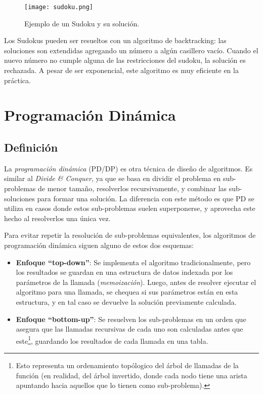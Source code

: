 \begin{figure}[H]
    \centering
    \texttt{[image: sudoku.png]}
    \caption*{Ejemplo de un Sudoku y su solución.}
\end{figure}

Los Sudokus pueden ser resueltos con un algoritmo de backtracking: las soluciones son extendidas agregando un número a algún casillero vacío. Cuando el nuevo número no cumple alguna de las restricciones del sudoku, la solución es rechazada. A pesar de ser exponencial, este algoritmo es muy eficiente en la práctica.

\section{Programación Dinámica}

\subsection{Definición}

La \textit{programación dinámica} (PD/DP) es otra técnica de diseño de algoritmos. Es similar al \textit{Divide \& Conquer}, ya que se basa en dividir el problema en sub-problemas de menor tamaño, resolverlos recursivamente, y combinar las sub-soluciones para formar una solución. La diferencia con este método es que PD se utiliza en casos donde estos sub-problemas suelen superponerse, y aprovecha este hecho al resolverlos una única vez.

Para evitar repetir la resolución de sub-problemas equivalentes, los algoritmos de programación dinámica siguen alguno de estos dos esquemas:
\begin{itemize}
    \item \textbf{Enfoque ``top-down''}: Se implementa el algoritmo tradicionalmente, pero los resultados se guardan en una estructura de datos indexada por los parámetros de la llamada (\textit{memoización}). Luego, antes de resolver ejecutar el algoritmo para una llamada, se chequea si sus parámetros están en esta estructura, y en tal caso se devuelve la solución previamente calculada.
    \item \textbf{Enfoque ``bottom-up''}: Se resuelven los sub-problemas en un orden que asegura que las llamadas recursivas de cada uno son calculadas antes que este\footnote{Esto representa un ordenamiento topólogico del árbol de llamadas de la función (en realidad, del árbol invertido, donde cada nodo tiene una arista apuntando hacia aquellos que lo tienen como sub-problema).}, guardando los resultados de cada llamada en una tabla.
\end{itemize}

